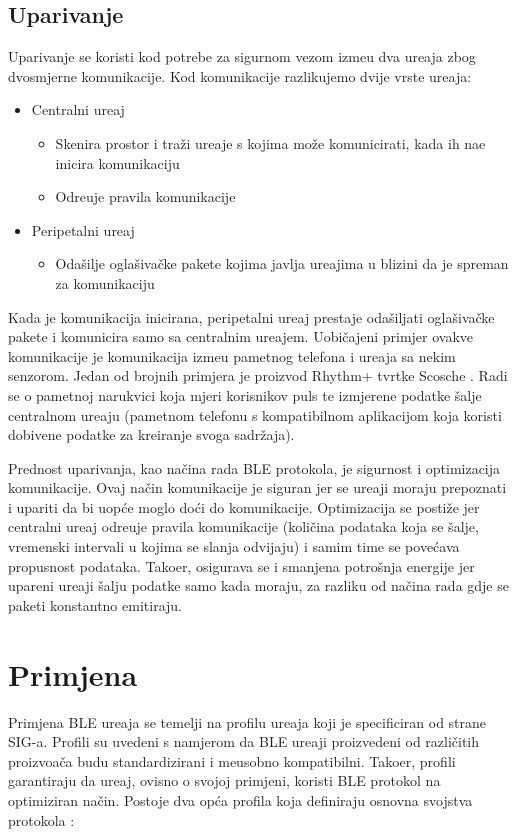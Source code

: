 \subsection{Uparivanje}
Uparivanje se koristi kod potrebe za sigurnom vezom izme\dj u dva ure\dj aja zbog dvosmjerne komunikacije. Kod komunikacije razlikujemo dvije vrste ure\dj aja:


\begin{itemize}
	\item Centralni ure\dj aj
	\begin{itemize}
		\item Skenira prostor i tra\v{z}i ure\dj aje s kojima mo\v{z}e komunicirati, kada ih na\dj e inicira komunikaciju
		\item Odre\dj uje pravila komunikacije
	\end{itemize}
	\item Peripetalni ure\dj aj
	\begin{itemize}
		\item Oda\v{s}ilje ogla\v{s}iva\v{c}ke pakete kojima javlja ure\dj ajima u blizini da je spreman za komunikaciju
	\end{itemize}
\end{itemize}

Kada je komunikacija inicirana, peripetalni ure\dj aj prestaje oda\v{s}iljati ogla\v{s}iva\v{c}ke pakete i komunicira samo sa centralnim ure\dj ajem. Uobi\v{c}ajeni primjer ovakve komunikacije je komunikacija izme\dj u pametnog telefona i ure\dj aja sa nekim senzorom. Jedan od brojnih primjera je proizvod Rhythm+ tvrtke Scosche \cite{scosche} . Radi se o pametnoj narukvici koja mjeri korisnikov puls te izmjerene podatke \v{s}alje centralnom ure\dj aju (pametnom telefonu s kompatibilnom aplikacijom koja koristi dobivene podatke za kreiranje svoga sadr\v{z}aja).

Prednost uparivanja, kao na\v{c}ina rada BLE protokola, je sigurnost i optimizacija komunikacije. Ovaj na\v{c}in komunikacije je siguran jer se ure\dj aji moraju prepoznati i upariti da bi uop\'{c}e moglo do\'{c}i do komunikacije. Optimizacija se posti\v{z}e jer centralni ure\dj aj odre\dj uje pravila komunikacije (koli\v{c}ina podataka koja se \v{s}alje, vremenski intervali u kojima se slanja odvijaju) i samim time se pove\'{c}ava propusnost podataka. Tako\dj er, osigurava se i smanjena potro\v{s}nja energije jer upareni ure\dj aji \v{s}alju podatke samo kada moraju, za razliku od na\v{c}ina rada gdje se paketi konstantno emitiraju.


\section{Primjena}
Primjena BLE ure\dj aja se temelji na profilu ure\dj aja koji je specificiran od strane SIG-a. Profili su uvedeni s namjerom da BLE ure\dj aji proizvedeni od razli\v{c}itih proizvo\dj a\v{c}a budu standardizirani i me\dj usobno kompatibilni. Tako\dj er, profili garantiraju da ure\dj aj, ovisno o svojoj primjeni, koristi BLE protokol na optimiziran na\v{c}in. Postoje dva op\'{c}a profila koja definiraju osnovna svojstva protokola \cite{ble_getting_started}:

